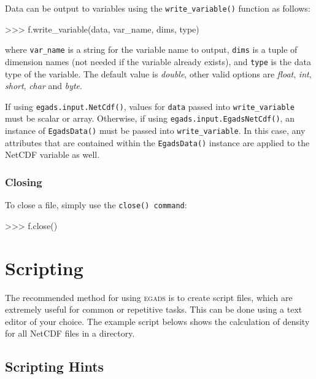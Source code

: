 \documentclass[a4paper,11pt]{report}
\newcommand{\egads}{\textsc{egads} }
\begin{document}
Data can be output to variables using the \verb|write_variable()| function as follows:

\begin{command}
    >>> f.write_variable(data, var_name, dims, type)
\end{command}

where \verb|var_name| is a string for the variable name to output, \verb|dims| is a tuple 
of dimension names (not needed if the variable already exists), and \verb|type| is the 
data type of the variable. The default value is \textit{double}, other valid options 
are \textit{float}, \textit{int}, \textit{short}, \textit{char} and \textit{byte}. 

If using \verb|egads.input.NetCdf()|, values for \verb|data| passed into \verb|write_variable| 
must be scalar or array. Otherwise, if using \verb|egads.input.EgadsNetCdf()|, an instance 
of \verb|EgadsData()| must be passed into \verb|write_variable|. In this case, any attributes 
that are contained within the \verb|EgadsData()| instance are applied to the NetCDF variable as well.

\subsubsection{Closing}

To close a file, simply use the \verb|close() command|:

\begin{command}
    >>> f.close()
\end{command}

\section{Scripting}

The recommended method for using \egads is to create script files, which are extremely useful for common or 
repetitive tasks. This can be done using a text editor of your choice. The example script belows 
shows the calculation of density for all NetCDF files in a directory.


\subsection{Scripting Hints}
\end{document}
